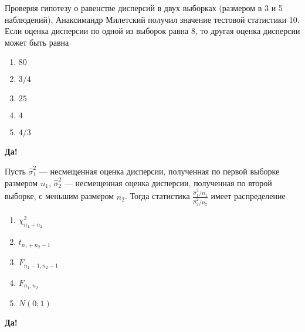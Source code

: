 \documentclass[t]{beamer}
\begin{document}
 \begin{frame} \label{23-Yes} 
\begin{block}{23} 

Проверяя гипотезу о равенстве дисперсий в двух выборках (размером в 3 и 5 наблюдений), Анаксимандр Милетский получил значение тестовой статистики 10. Если оценка дисперсии по одной из выборок равна 8, то другая оценка дисперсии может быть равна
 


 \end{block} 
\begin{enumerate} 
\item[] \hyperlink{23-Yes}{\beamergotobutton{} $80$}
\item[] \hyperlink{23-No}{\beamergotobutton{} $3/4$}
\item[] \hyperlink{23-No}{\beamergotobutton{} $25$}
\item[] \hyperlink{23-No}{\beamergotobutton{} $4$}
\item[] \hyperlink{23-No}{\beamergotobutton{} $4/3$}
\end{enumerate} 

 \textbf{Да!} 
 \hyperlink{24}{}\end{frame} 


 \begin{frame} \label{24-Yes} 
\begin{block}{24} 

Пусть  $\hat{\sigma}^2_1$ — несмещенная оценка дисперсии, полученная по первой выборке размером $n_1$,   $\hat{\sigma}^2_2$ — несмещенная оценка дисперсии, полученная по второй выборке, с меньшим размером  $n_2$. Тогда статистика $\frac{\hat{\sigma}^2_1/n_1}{\hat{\sigma}^2_2/n_2}$  имеет распределение
 


 \end{block} 
\begin{enumerate} 
\item[] \hyperlink{24-No}{\beamergotobutton{} $\chi^2_{n_1+n_2}$}
\item[] \hyperlink{24-No}{\beamergotobutton{} $t_{n_1+n_2-1}$}
\item[] \hyperlink{24-No}{\beamergotobutton{} $F_{n_1-1,n_2-1}$}
\item[] \hyperlink{24-No}{\beamergotobutton{} $F_{n_1,n_2}$}
\item[] \hyperlink{24-No}{\beamergotobutton{} $N(0;1)$}
\end{enumerate} 

 \textbf{Да!} 
 \hyperlink{25}{}\end{frame} 
\end{document}
